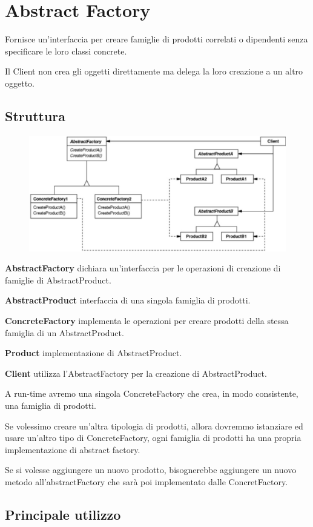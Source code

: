 \section{Abstract Factory}

Fornisce un’interfaccia per creare famiglie di prodotti correlati o dipendenti senza specificare le loro classi concrete.

Il Client non crea gli oggetti direttamente ma delega la loro creazione a un altro oggetto.

\subsection{Struttura}

\begin{figure}[H]
    \centering
    \includegraphics[width=0.5\linewidth]{../../immagini/pattern_creazionale/struttura_abstract_factory}
\end{figure}

\textbf{AbstractFactory} dichiara un’interfaccia per le operazioni di creazione di famiglie di AbstractProduct.

\textbf{AbstractProduct} interfaccia di una singola famiglia di prodotti.

\textbf{ConcreteFactory} implementa le operazioni per creare prodotti della stessa famiglia di un AbstractProduct.

\textbf{Product} implementazione di AbstractProduct.

\textbf{Client} utilizza l'AbstractFactory per la creazione di AbstractProduct.
\medskip

A run-time avremo una singola ConcreteFactory che crea, in modo consistente, una famiglia di prodotti.

Se volessimo creare un'altra tipologia di prodotti, allora dovremmo istanziare ed usare un'altro tipo di ConcreteFactory, ogni famiglia di prodotti ha una propria 
implementazione di abstract factory.

Se si volesse aggiungere un nuovo prodotto, bisognerebbe aggiungere un nuovo metodo all'abstractFactory che sarà poi implementato dalle ConcretFactory.

\subsection{Principale utilizzo}

